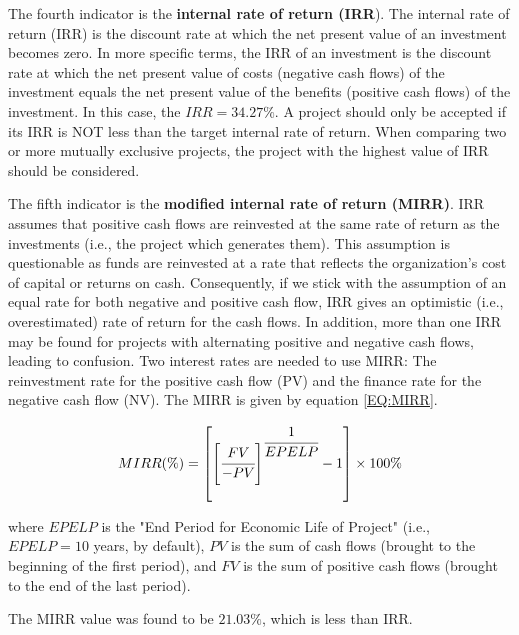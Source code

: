 	The fourth indicator is the \textbf{internal rate of return (IRR}). The internal rate of return (IRR) is the discount rate at which the net present value of an investment becomes zero. In more specific terms, the IRR of an investment is the discount rate at	which the net present value of costs (negative cash flows) of the investment equals the net present value of the benefits (positive cash flows) of the investment. In this case, the $IRR = 34.27\%$. A project should only be accepted if its IRR is NOT less than the target internal rate of return. When comparing two or more mutually exclusive projects, the project with the highest value of IRR should be considered.

	The fifth indicator is the \textbf{modified internal rate of return (MIRR)}. IRR assumes that positive cash flows are reinvested at the same rate of return as the investments (i.e., the project which generates them). This assumption is questionable as funds are reinvested at a rate that reflects the organization’s cost of capital or returns on cash. Consequently, if we stick with the assumption of an equal rate for both negative and positive cash flow, IRR gives an optimistic (i.e., overestimated) rate of return for the cash flows. In addition, more than one IRR may be found for projects with alternating positive and negative cash flows, leading to confusion. Two interest rates are needed to use MIRR: The reinvestment rate for the positive cash flow (PV) and the finance rate for the negative cash flow (NV). The MIRR is given by equation \ref{EQ:MIRR}.

	\begin{equation}
		MIRR(\%) = \left[ \left[ \cfrac{FV}{-PV} \right]^{\cfrac{1}{EPELP}} -1 \right] \times 100\%
		\label{EQ:MIRR}
	\end{equation}

	where $EPELP$ is the "End Period for Economic Life of Project" (i.e., $EPELP=10$ years, by default), $PV$ is the sum of cash flows (brought to the beginning of the first period), and $FV$ is the sum of positive cash flows (brought to the end of the last period).
	
	The MIRR value was found to be $21.03\%$, which is less than IRR.


	
	\clearpage
	
	